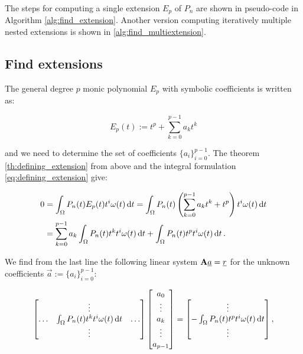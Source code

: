 \documentclass[a4paper,10pt]{article}
\begin{document}
The steps for computing a single extension $E_p$ of $P_n$ are shown in pseudo-code
in Algorithm \ref{alg:find_extension}. Another version computing iteratively
multiple nested extensions is shown in \ref{alg:find_multiextension}.


\subsection{Find extensions}

The general degree $p$ monic polynomial $E_p$ with symbolic coefficients is
written as:

\begin{equation}
  E_p(t) := t^p + \sum_{k=0}^{p-1} a_k t^k
\end{equation}

and we need to determine the set of coefficients $\{a_i\}_{i=0}^{p-1}$.
The theorem \ref{th:defining_extension} from above and the integral formulation
\eqref{eq:defining_extension} give:

\begin{equation}
\begin{split}
  0 & = \int_\Omega P_n(t) E_p(t) t^i \omega(t) \,\mathrm{d}t
      = \int_\Omega P_n(t) \left(\sum_{k=0}^{p-1} a_k t^k + t^p\right) t^i \omega(t) \,\mathrm{d}t \\
    & = \sum_{k=0}^{p-1} a_k \int_\Omega P_n(t) t^k t^i \omega(t) \,\mathrm{d}t
      + \int_\Omega P_n(t) t^p t^i \omega(t) \,\mathrm{d}t \,.
\end{split}
\end{equation}

We find from the last line the following linear system $\mathbf{A} \underline{a} = \underline{r}$
for the unknown coefficients $\vec{a} := \{a_i\}_{i=0}^{p-1}$:

\begin{equation}
  \label{eq:linsys_for_extension}
  \begin{bmatrix}
    {}     & \vdots                                        & {} \\
    \hdots & \int_\Omega P_n(t) t^k t^i \omega(t) \,\mathrm{d}t & \hdots \\
    {}     & \vdots                                        & {} \\
  \end{bmatrix}
  \begin{bmatrix}
    a_0 \\
    \vdots \\
    a_k \\
    \vdots \\
    a_{p-1}
  \end{bmatrix}
  =
  \begin{bmatrix}
  \vdots \\
  - \int_\Omega P_n(t) t^p t^i \omega(t) \,\mathrm{d}t \\
  \vdots \\
  \end{bmatrix},
\end{equation}
\end{document}
